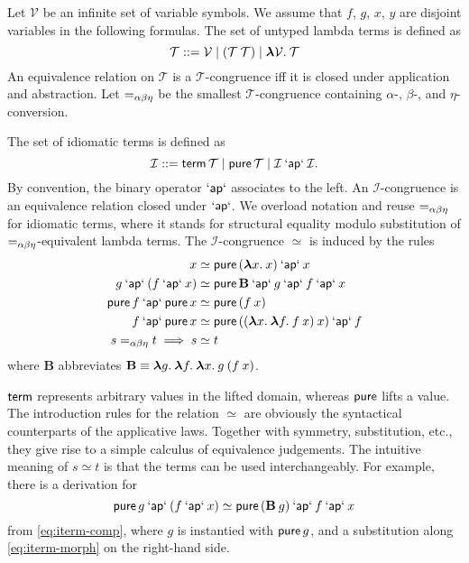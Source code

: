 \begin{definition}
Let $\mathcal{V}$ be an infinite set of variable symbols.
We assume that $f$, $g$, $x$, $y$ are disjoint variables in the following
formulas.
The set of untyped lambda terms is defined as
\begin{equation}
	\mathcal{T} ::= \mathcal{V} \mid (\mathcal{T} \> \mathcal{T}) \mid
		{\boldsymbol\lambda} \mathcal{V}.\>\mathcal{T}
\end{equation}
An equivalence relation on $\mathcal{T}$ is a $\mathcal{T}$-congruence iff it
is closed under application and abstraction.
Let $=_{\alpha\beta\eta}$ be the smallest $\mathcal{T}$-congruence containing $\alpha$-,
$\beta$-, and $\eta$-conversion.
\end{definition}

\begin{definition}
The set of idiomatic terms is defined as
\begin{equation}
	\mathcal{I} ::= \operatorname{\mathsf{term}} \mathcal{T} \mid \operatorname{\mathsf{pure}} \mathcal{T} \mid
		\mathcal{I} \mathbin{\mathsf{`ap`}} \mathcal{I}.
\end{equation}
By convention, the binary operator $\mathbin{\mathsf{`ap`}}$ associates to the left.
An $\mathcal{I}$-congruence is an equivalence relation closed under $\mathbin{\mathsf{`ap`}}$.
We overload notation and reuse $=_{\alpha\beta\eta}$ for idiomatic terms, where it stands
for structural equality modulo substitution of $=_{\alpha\beta\eta}$-equivalent lambda
terms.
The $\mathcal{I}$-congruence $\simeq$ is induced by the rules
\begin{align}
	x &\simeq \operatorname{\mathsf{pure}}{({\boldsymbol\lambda} x.\>x)} \mathbin{\mathsf{`ap`}} x \label{eq:iterm-id}\\
	g \mathbin{\mathsf{`ap`}} (f \mathbin{\mathsf{`ap`}} x) &\simeq \operatorname{\mathsf{pure}} \mathbf{B} \mathbin{\mathsf{`ap`}} g \mathbin{\mathsf{`ap`}} f \mathbin{\mathsf{`ap`}} x \label{eq:iterm-comp}\\
	\operatorname{\mathsf{pure}} f \mathbin{\mathsf{`ap`}} \operatorname{\mathsf{pure}} x &\simeq \operatorname{\mathsf{pure}}{(f \> x)} \label{eq:iterm-morph}\\
	f \mathbin{\mathsf{`ap`}} \operatorname{\mathsf{pure}} x &\simeq \operatorname{\mathsf{pure}}{(({\boldsymbol\lambda} x.\>{\boldsymbol\lambda} f.\>f \> x) \> x)} \mathbin{\mathsf{`ap`}} f \label{eq:iterm-xchng}\\
	s =_{\alpha\beta\eta} t \implies s &\simeq t \label{eq:termeq-lift}
\end{align}
where $\mathbf{B}$ abbreviates
$\mathbf{B} \equiv {\boldsymbol\lambda} g.\>{\boldsymbol\lambda} f.\>{\boldsymbol\lambda} x.\>g \> (f \> x)$.
\end{definition}

$\operatorname{\mathsf{term}}$ represents arbitrary values in the lifted domain, whereas $\operatorname{\mathsf{pure}}$
lifts a value.
The introduction rules for the relation $\simeq$ are obviously the syntactical
counterparts of the applicative laws.
Together with symmetry, substitution, etc., they give rise to a simple
calculus of equivalence judgements.
The intuitive meaning of $s \simeq t$ is that the terms can be used
interchangeably.
For example, there is a derivation for
\begin{equation}\label{eq:pure-rotate}
	\operatorname{\mathsf{pure}} g \mathbin{\mathsf{`ap`}} (f \mathbin{\mathsf{`ap`}} x) \simeq \operatorname{\mathsf{pure}}{(\mathbf{B} \> g)} \mathbin{\mathsf{`ap`}} f \mathbin{\mathsf{`ap`}} x
\end{equation}
from \eqref{eq:iterm-comp}, where $g$ is instantied with $\operatorname{\mathsf{pure}} g$, and a
substitution along \eqref{eq:iterm-morph} on the right-hand side.

